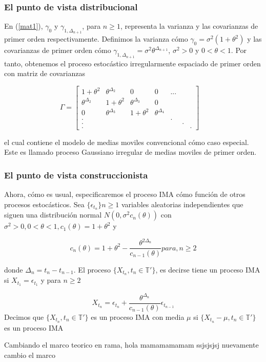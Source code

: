 \subsubsection{El punto de vista distribucional}
En (\ref{mat1}), $\gamma_0$ y $\gamma_{1,\Delta_{n+1}}$, para $n\geq1$, representa la varianza y las covarianzas 
de primer orden respectivamente. Definimos la varianza cómo $\gamma_0=\sigma^2(1+\theta^2)$ y las covarianzas de 
primer orden cómo $\gamma_{1,\Delta_{n+1}}=\sigma^2 \theta^{\Delta_{n+1}}$, $\sigma^2 >0$ y $0<\theta <1$. 
Por tanto, obtenemos el proceso estocástico irregularmente espaciado de primer orden con matriz de covarianzas

\begin{equation}
    \Gamma=
	\begin{bmatrix} 
	1+\theta^2 & \theta^{\Delta_2} & 0 & 0 & ... \\
	\theta^{\Delta_2} & 1+\theta^2 & \theta^{\Delta_3}& 0\\
	0 & \theta^{\Delta_3} & 1+\theta^2 & \theta^{\Delta_4} \\
	.& & & & . \\
	.& & & & & .\\
	. & & & & & & .
	\end{bmatrix}
	\quad
	\label{mat2}
\end{equation}

el cual contiene el modelo de medias moviles convencional cómo caso especial. Este es llamado proceso Gaussiano 
irregular de medias moviles de primer orden.

\subsubsection{El punto de vista construccionista}
Ahora, cómo es usual, especificaremos el proceso IMA cómo función de otros procesos estocásticos. 
Sea $\lbrace \epsilon_{t_n}\rbrace n\geq 1$ variables aleatorias independientes que siguen una distribución 
normal $N(0,\sigma^2 c_n(\theta))$ con $\sigma^2 >0, 0<\theta<1, c_1(\theta)=1+\theta^2$ y

$$
c_n(\theta)=1+\theta^2-\frac{\theta^{2\Delta_n}}{c_{n-1}(\theta)} para, n\geq 2
$$

donde $\Delta_n=t_n-t_{n-1}$. El proceso $\lbrace X_{t_n},t_n \in \mathbb{T'} \rbrace$, es decirse tiene un proceso 
IMA si $X_{t_1}=\epsilon_{t_1}$ y para $n\geq 2 $

\begin{equation}
    X_{t_n}= \epsilon_{t_n}+\frac{\theta^{\Delta_n}}{c_{n-1}(\theta)}\epsilon_{t_{n-1}}
\end{equation}
Decimos que $\lbrace X_{t_n},t_n \in \mathbb{T'} \rbrace$ es un proceso IMA con media 
$\mu$ si $\lbrace X_{t_n}-\mu,t_n \in \mathbb{T'} \rbrace$ es un proceso IMA


Cambiando el marco teorico en rama, hola mamamamamam
ssjsjsjsj nuevamente cambio el marco